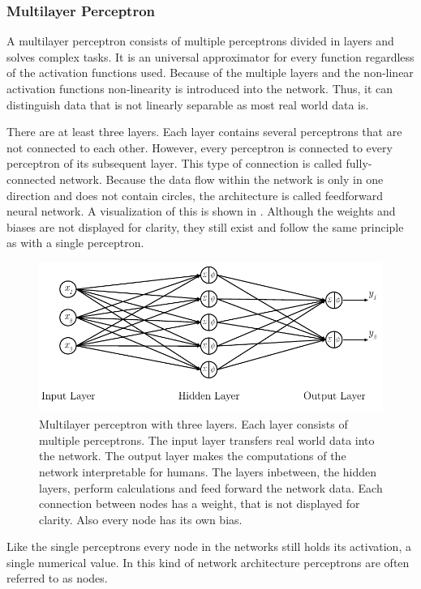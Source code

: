 \subsubsection{Multilayer Perceptron}
\label{sec:mlp-multilayer-perceptron}
A multilayer perceptron consists of multiple perceptrons divided in layers and solves complex tasks\cite{Bishop1995}.
It is an universal approximator for every function\cite{Cybenko1989} regardless of the activation functions used\cite{Hornik1991}.
Because of the multiple layers and the non-linear activation functions non-linearity is introduced into the network.
Thus, it can distinguish data that is not linearly separable as most real world data is.

There are at least three layers.
Each layer contains several perceptrons that are not connected to each other.
However, every perceptron is connected to every perceptron of its subsequent layer.
This type of connection is called fully-connected network.
Because the data flow within the network is only in one direction and does not contain circles, the architecture is called feedforward neural network.
A visualization of this is shown in .
Although the weights and biases are not displayed for clarity, they still exist and follow the same principle as with a single perceptron.
\begin{figure}
	\centering
	\includegraphics{images/multilayer-perceptron}
	\caption[Multilayer Perceptron]{Multilayer perceptron with three layers. Each layer consists of multiple perceptrons. The input layer transfers real world data into the network. The output layer makes the computations of the network interpretable for humans. The layers inbetween, the hidden layers, perform calculations and feed forward the network data. Each connection between nodes has a weight, that is not displayed for clarity. Also every node has its own bias.}
	\label{fig:multilayer-perceptron}
\end{figure}
Like the single perceptrons every node in the networks still holds its activation, a single numerical value.
In this kind of network architecture perceptrons are often referred to as nodes.

